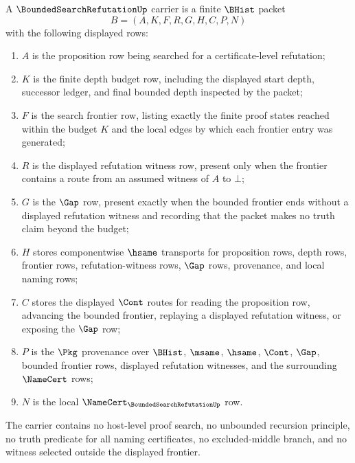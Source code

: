\begin{definition}
\label{def:bounded-search-refutation-carrier}
A $\BoundedSearchRefutationUp$ carrier is a finite $\BHist$ packet
$$
B=(A,K,F,R,G,H,C,P,N)
$$
with the following displayed rows:
\begin{enumerate}
\item $A$ is the proposition row being searched for a certificate-level refutation;
\item $K$ is the finite depth budget row, including the displayed start depth, successor ledger, and final bounded depth inspected by the packet;
\item $F$ is the search frontier row, listing exactly the finite proof states reached within the budget $K$ and the local edges by which each frontier entry was generated;
\item $R$ is the displayed refutation witness row, present only when the frontier contains a route from an assumed witness of $A$ to $\bot$;
\item $G$ is the $\Gap$ row, present exactly when the bounded frontier ends without a displayed refutation witness and recording that the packet makes no truth claim beyond the budget;
\item $H$ stores componentwise $\hsame$ transports for proposition rows, depth rows, frontier rows, refutation-witness rows, $\Gap$ rows, provenance, and local naming rows;
\item $C$ stores the displayed $\Cont$ routes for reading the proposition row, advancing the bounded frontier, replaying a displayed refutation witness, or exposing the $\Gap$ row;
\item $P$ is the $\Pkg$ provenance over $\BHist$, $\msame$, $\hsame$, $\Cont$, $\Gap$, bounded frontier rows, displayed refutation witnesses, and the surrounding $\NameCert$ rows;
\item $N$ is the local $\NameCert_{\BoundedSearchRefutationUp}$ row.
\end{enumerate}
The carrier contains no host-level proof search, no unbounded recursion principle, no truth predicate for all naming certificates, no excluded-middle branch, and no witness selected outside the displayed frontier.
\end{definition}


